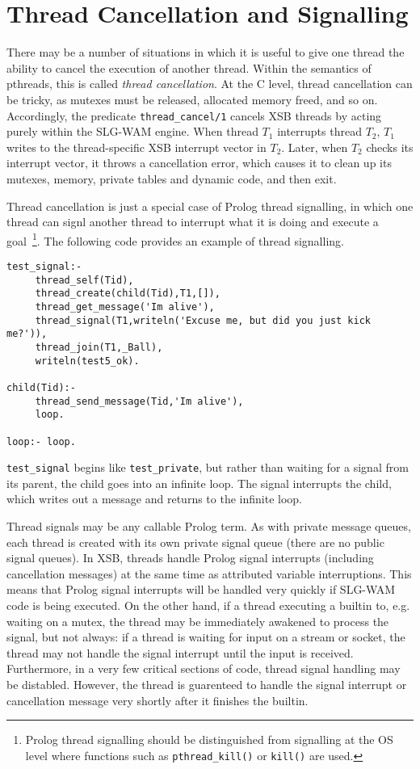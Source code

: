 \section{Thread Cancellation and Signalling} \label{sec:thread-signals}
%
There may be a number of situations in which it is useful to give one
thread the ability to cancel the execution of another thread.  Within
the semantics of pthreads, this is called {\em thread cancellation}.
At the C level, thread cancellation can be tricky, as mutexes must be
released, allocated memory freed, and so on.  Accordingly, the
predicate {\tt thread\_cancel/1} cancels XSB threads by acting purely
within the SLG-WAM engine.  When thread $T_1$ interrupts thread $T_2$,
$T_1$ writes to the thread-specific XSB interrupt vector in $T_2$.
Later, when $T_2$ checks its interrupt vector, it throws a
cancellation error, which causes it to clean up its mutexes, memory,
private tables and dynamic code, and then exit.

Thread cancellation is just a special case of Prolog thread
signalling, in which one thread can signl another thread to interrupt
what it is doing and execute a goal~\footnote{Prolog thread signalling
  should be distinguished from signalling at the OS level where
  functions such as {\tt pthread\_kill()} or {\tt kill()} are used.}.  The
following code provides an example of thread signalling.
%
\begin{verbatim}
test_signal:- 
     thread_self(Tid),
     thread_create(child(Tid),T1,[]),
     thread_get_message('Im alive'),
     thread_signal(T1,writeln('Excuse me, but did you just kick me?')),
     thread_join(T1,_Ball),
     writeln(test5_ok).

child(Tid):- 
     thread_send_message(Tid,'Im alive'),
     loop.

loop:- loop.
\end{verbatim}
%
{\tt test\_signal} begins like {\tt test\_private}, but rather than
waiting for a signal from its parent, the child goes into an infinite
loop.  The signal interrupts the child, which writes out a message and
returns to the infinite loop.

Thread signals may be any callable Prolog term.  As with private
message queues, each thread is created with its own private signal
queue (there are no public signal queues).  In XSB, threads handle
Prolog signal interrupts (including cancellation messages) at the same
time as attributed variable interruptions.  This means that Prolog
signal interrupts will be handled very quickly if SLG-WAM code is
being executed.  On the other hand, if a thread executing a builtin
to, e.g. waiting on a mutex, the thread may be immediately awakened to
process the signal, but not always: if a thread is waiting for input
on a stream or socket, the thread may not handle the signal interrupt
until the input is received.  Furthermore, in a very few critical
sections of code, thread signal handling may be distabled.  However,
the thread is guarenteed to handle the signal interrupt or
cancellation message very shortly after it finishes the builtin.

